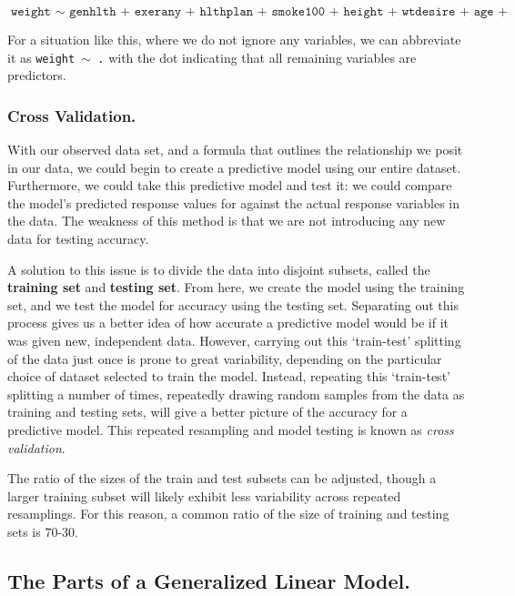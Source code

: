 \documentclass[12pt]{article}
\begin{document}
$$\texttt{weight $\sim$ genhlth + exerany + hlthplan + smoke100 + height + wtdesire + age + gender}$$

For a situation like this, where we do not ignore any variables, we can abbreviate it as \texttt{weight $\sim$ .} with the dot indicating that all remaining variables are predictors.

	\subsubsection{Cross Validation.}
With our observed data set, and a formula that outlines the relationship we posit in our data, we could begin to create a predictive model using our entire dataset.  Furthermore, we could take this predictive model and test it: we could compare the model's predicted response values for against the actual response variables in the data.  The weakness of this method is that we are not introducing any new data for testing accuracy.  

A solution to this issue is to divide the data into disjoint subsets, called the \textbf{training set} and \textbf{testing set}.  From here, we 
create the model using the training set, and we test the model for accuracy using the testing set.  Separating out this process gives us a better 
idea of how accurate a predictive model would be if it was given new, independent data.  However, carrying out this `train-test' splitting of the data just 
once is prone to great variability, depending on the particular choice of dataset selected to train the model.  Instead, repeating this `train-test' 
splitting a number of times, repeatedly drawing random samples from the data as training and testing sets, will give a better picture of the 
accuracy for a predictive model.  This repeated resampling and model testing is known as \textit{cross validation}.

The ratio of the sizes of the train and test subsets can be adjusted, though a larger training subset will likely exhibit less variability across
repeated resamplings.  For this reason, a common ratio of the size of training and testing sets is 70-30.  %

\subsection{The Parts of a Generalized Linear Model.}
\end{document}
